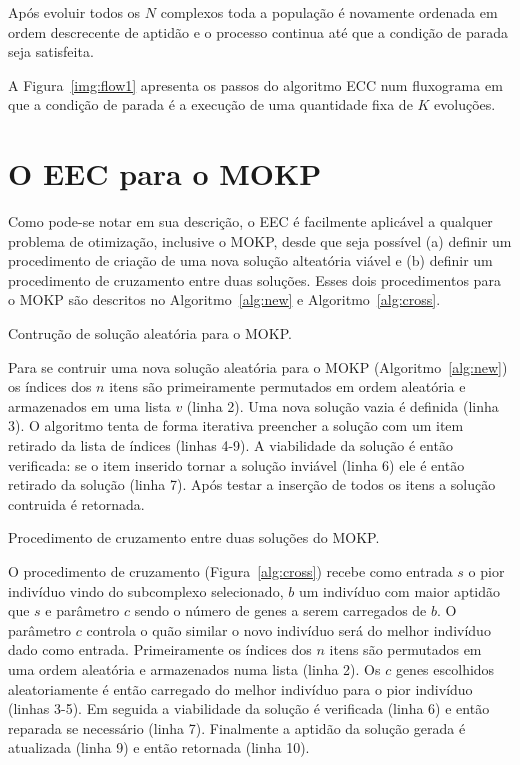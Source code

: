 Após evoluir todos os $N$ complexos toda a população é novamente ordenada
em ordem descrecente de aptidão e o processo continua até que a condição
de parada seja satisfeita.

A Figura~\ref{img:flow1} apresenta os passos do algoritmo ECC num fluxograma
em que a condição de parada é a execução de uma quantidade fixa de $K$ evoluções.


\section{O EEC para o MOKP}
Como pode-se notar em sua descrição, o EEC é facilmente aplicável a qualquer
problema de otimização, inclusive o MOKP, desde que seja possível (a) definir
um procedimento de criação de uma nova solução alteatória viável e (b) definir
um procedimento de cruzamento entre duas soluções.
Esses dois procedimentos para o MOKP são descritos no Algoritmo~\ref{alg:new}
e Algoritmo~\ref{alg:cross}.

\begin{algorithm}
  
  \caption{Contrução de solução aleatória para o MOKP.}
  \label{alg:new}
\end{algorithm}

Para se contruir uma nova solução aleatória para o MOKP (Algoritmo~\ref{alg:new})
os índices dos $n$ itens são primeiramente permutados em ordem aleatória e
armazenados em uma lista $v$ (linha 2).
Uma nova solução vazia é definida (linha 3).
O algoritmo tenta de forma iterativa preencher a solução com um item retirado
da lista de índices (linhas 4-9).
A viabilidade da solução é então verificada: se o item inserido tornar a solução
inviável (linha 6) ele é então retirado da solução (linha 7).
Após testar a inserção de todos os itens a solução contruida é retornada.

\begin{algorithm}
  
  \caption{Procedimento de cruzamento entre duas soluções do MOKP.}
  \label{alg:cross}
\end{algorithm}

O procedimento de cruzamento (Figura~\ref{alg:cross}) recebe como entrada
$s$ o pior indivíduo vindo do subcomplexo selecionado, $b$ um indivíduo com
maior aptidão que $s$ e parâmetro $c$ sendo o número de genes a serem carregados de $b$.
O parâmetro $c$ controla o quão similar o novo indivíduo será do melhor indivíduo
dado como entrada.
Primeiramente os índices dos $n$ itens são permutados em uma ordem aleatória e armazenados numa lista
(linha 2).
Os $c$ genes escolhidos aleatoriamente é então carregado do melhor indivíduo para
o pior indivíduo (linhas 3-5).
Em seguida a viabilidade da solução é verificada (linha 6) e então reparada
se necessário (linha 7).
Finalmente a aptidão da solução gerada é atualizada (linha 9) e então retornada (linha 10).

